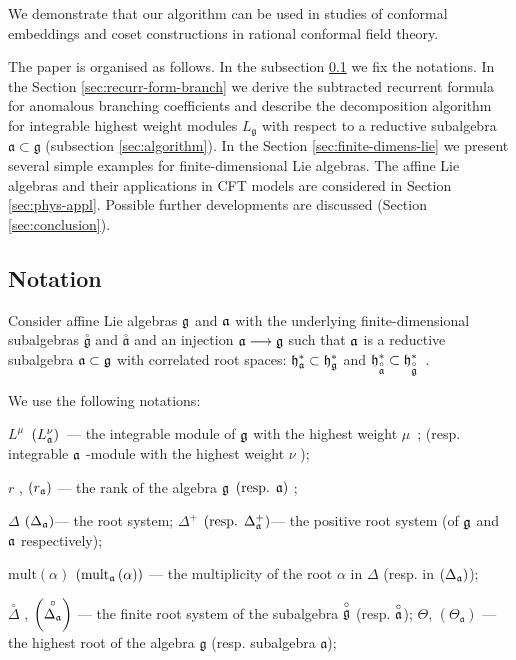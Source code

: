 \documentclass[12pt]{iopart}
\theoremstyle{definition}
\theoremstyle{definition}
\theoremstyle{definition}
\newcommand{\go}{\stackrel{\circ }{\mathfrak{g}}}
\newcommand{\ao}{\stackrel{\circ }{\mathfrak{a}}}
\newcommand{\co}[1]{\stackrel{\circ }{#1}}
\begin{document}
We demonstrate that our algorithm can be used in studies of conformal embeddings and coset constructions
in rational conformal field theory.

The paper is organised as follows. In the subsection \ref{sec:notation}  we fix the notations.
In the Section \ref{sec:recurr-form-branch} we derive the subtracted recurrent formula for anomalous
branching coefficients and describe the decomposition algorithm for integrable highest weight modules
$L_{\mathfrak{g}}$ with respect to a reductive subalgebra $\mathfrak{a}\subset \mathfrak{g}$
(subsection \ref{sec:algorithm}). In the Section \ref{sec:finite-dimens-lie} we present several
simple examples for finite-dimensional Lie algebras. The affine Lie algebras and their applications in
CFT models are considered in Section \ref{sec:phys-appl}.
Possible further developments are discussed (Section \ref{sec:conclusion}).

\subsection{Notation}
\label{sec:notation}

Consider affine Lie algebras $\frak{g}$ and $\frak{a}$ with the
underlying finite-dimensional subalgebras $\go$ and $%
\ao$ and an injection $\frak{a}\longrightarrow \frak{g%
}$ such that $\frak{a}$ is a reductive subalgebra $\frak{a\subset g}$ with
correlated root spaces: $\frak{h}_{\frak{a}}^{\ast }\subset \frak{h}_{\frak{g%
}}^{\ast }$ and $\frak{h}_{\ao}^{\ast }\subset \frak{h%
}_{\go}^{\ast }$\ .

We use the following notations:

$L^{\mu }$\ $\left( L_{\frak{a}}^{\nu }\right) $\ --- the integrable module
of $\frak{g}$ with the highest weight $\mu $\ ; (resp. integrable $\frak{a}$
-module with the highest weight $\nu $ );

$r$ , $\left( r_{\frak{a}}\right) $ --- the rank of the algebra $\frak{g}$ $%
\left( \mbox{resp. }\frak{a}\right) $ ;

$\Delta $ $\left( \Delta _{\frak{a}}\right) $--- the root system; $\Delta
^{+} $ $\left( \mbox{resp. }\Delta _{\frak{a}}^{+}\right) $--- the positive
root system (of $\frak{g}$ and $\frak{a}$ respectively);

$\mathrm{mult}\left( \alpha \right) $ $\left( \mathrm{mult}_{\frak{a}}\left(
\alpha \right) \right) $ --- the multiplicity of the root $\alpha$ in $\Delta
$ (resp. in $\left( \Delta _{\frak{a}}\right) $);

$\co{\Delta}$ , $\left( \co{\Delta _{\frak{a}}}%
\right)$ --- the finite root system of the subalgebra $\co{%
\frak{g}}$ (resp. $\co{\frak{a}}$);
$\Theta$, $(\Theta_{\mathfrak{a}})$ --- the highest root of the algebra $\mathfrak{g}$ (resp. subalgebra $\mathfrak{a}$);
\end{document}
